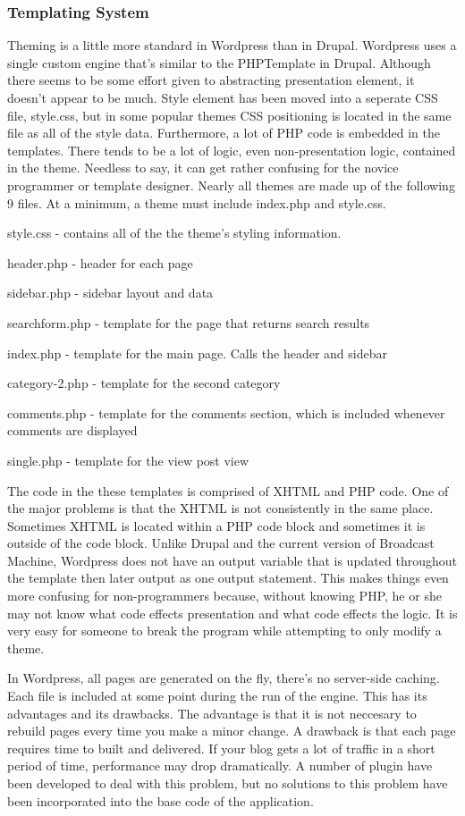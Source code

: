 \documentclass[a4paper,12pt]{report}
\begin{document}
\subsubsection{Templating System}
Theming is a little more standard in Wordpress than in Drupal. 
Wordpress uses a single custom engine that's similar to the PHPTemplate in Drupal. 
Although there seems to be some effort given to abstracting presentation element, it doesn't appear to be much. Style element has been moved into a seperate CSS file, style.css, but in some popular themes CSS positioning is located in the same file as all of the style data.
Furthermore, a lot of PHP code is embedded in the templates. 
There tends to be a lot of logic, even non-presentation logic, contained in the theme. Needless to say, it can get rather confusing for the novice programmer or template designer. 
Nearly all themes are made up of the following 9 files. At a minimum, a theme must include index.php and style.css. 

style.css - contains all of the the theme's styling information.

header.php - header for each page

sidebar.php - sidebar layout and data

searchform.php - template for the page that returns search results

index.php - template for the main page. Calls the header and sidebar

category-2.php - template for the second category

comments.php - template for the comments section, which is included whenever comments are displayed

single.php - template for the view post view


The code in the these templates is comprised of XHTML and PHP code. 
One of the major problems is that the XHTML is not consistently in the same place. 
Sometimes XHTML is located within a PHP code block and sometimes it is outside of the code block. 
Unlike Drupal and the current version of Broadcast Machine, Wordpress does not have an output variable that is updated throughout the template then later output as one output statement. 
This makes things even more confusing for non-programmers because, without knowing PHP, he or she may not know what code effects presentation and what code effects the logic. 
It is very easy for someone to break the program while attempting to only modify a theme. 


In Wordpress, all pages are generated on the fly, there's no server-side caching. 
Each file is included at some point during the run of the engine. 
This has its advantages and its drawbacks. 
The advantage is that it is not neccesary to rebuild pages every time you make a minor change. 
A drawback is that each page requires time to built and delivered. 
If your blog gets a lot of traffic in a short period of time, performance may drop dramatically. 
A number of plugin have been developed to deal with this problem, but no solutions to this problem have been incorporated into the base code of the application. 
\end{document}
